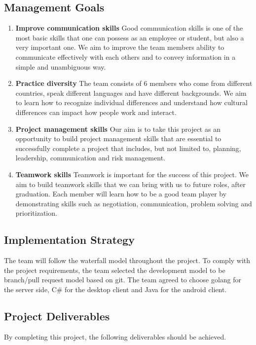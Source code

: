 \documentclass{article}
\begin{document}
\subsection{Management Goals}

\begin{enumerate}
  \item \textbf{Improve communication skills} Good communication skills is one of the most basic skills that one can possess as an employee or student, but also a very important one. We aim to improve the team members ability to communicate effectively with each others and  to convey information in a simple and unambiguous way.
  \item \textbf{Practice diversity} The team consists of 6 members who come from different countries, speak different languages and have different backgrounds. We aim to learn how to recognize individual differences and understand how cultural differences can impact how people work and interact.
  \item \textbf{Project management skills} Our aim is to take this project as an opportunity to build project management skills that are essential to successfully complete a project that includes, but not limited to, planning, leadership, communication and risk management.
  \item \textbf{Teamwork skills} Teamwork is important for the success of this project. We aim to build teamwork skills that we can bring with us to future roles, after graduation. Each member will learn how to be a good team player by demonstrating skills such as negotiation, communication, problem solving and prioritization.
\end{enumerate}

\subsection{Implementation Strategy}
The team will follow the waterfall model throughout the project. To comply with the project requirements, the team selected the development model to be branch/pull request model based on git. The team agreed to choose golang for the server side, C{\#} for the desktop client and Java for the android client.

\subsection{Project Deliverables}
By completing this project, the following deliverables should be achieved.
\end{document}
